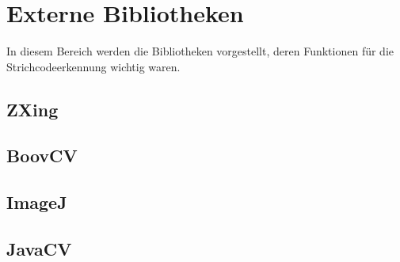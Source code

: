 \section{Externe Bibliotheken}
\writtenby{\dcauthornameriren}%
In diesem Bereich werden die Bibliotheken vorgestellt, deren Funktionen für die Strichcodeerkennung wichtig waren.


\subsection*{ZXing}



\subsection*{BoovCV}



\subsection*{ImageJ}



\subsection*{JavaCV}
